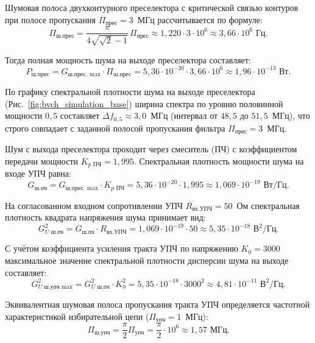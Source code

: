 Шумовая полоса двухконтурного преселектора с критической связью контуров при полосе пропускания $\Pi_{\text{прес}} = 3$~МГц рассчитывается по формуле:
\begin{equation}
    \Pi_{\text{ш.прес}} = \frac{\pi}{4\sqrt{\sqrt{2}-1}}\,\Pi_{\text{прес}} \approx 1{,}220 \cdot 3 \cdot 10^6 \approx 3{,}66 \cdot 10^6\text{ Гц}.
\end{equation}

Тогда полная мощность шума на выходе преселектора составляет:
\begin{equation}
    P_{\text{ш.прес}} = G_{\text{ш.прес. max}} \cdot \Pi_{\text{ш.прес}} = 5{,}36 \cdot 10^{-20} \cdot 3{,}66 \cdot 10^6 \approx 1{,}96 \cdot 10^{-13}\text{ Вт}.
\end{equation}

По графику спектральной плотности шума на выходе преселектора (Рис.~\ref{fig:bvch_simulation_base}) ширина спектра по уровню половинной мощности $0{,}5$ составляет $\Delta f_{0{,}5} \approx 3{,}0$~МГц (интервал от $48{,}5$ до $51{,}5$~МГц), что строго совпадает с заданной полосой пропускания фильтра $\Pi_{\text{прес}} = 3$~МГц.

Шум с выхода преселектора проходит через смеситель (ПЧ) с коэффициентом передачи мощности $K_{p\text{ ПЧ}} = 1{,}995$. Спектральная плотность мощности шума на входе УПЧ равна:
\begin{equation}
    G_{\text{ш.пч}} = G_{\text{ш.прес. max}} \cdot K_{p\text{ ПЧ}} = 5{,}36 \cdot 10^{-20} \cdot 1{,}995 \approx 1{,}069 \cdot 10^{-19}\text{ Вт/Гц}.
\end{equation}

На согласованном входном сопротивлении УПЧ $R_{\text{вх.УПЧ}} = 50$~Ом спектральная плотность квадрата напряжения шума принимает вид:
\begin{equation}
    G_{U\text{ ш.пч}}^2 = G_{\text{ш.пч}} \cdot R_{\text{вх.УПЧ}} = 1{,}069 \cdot 10^{-19} \cdot 50 \approx 5{,}35 \cdot 10^{-18}\text{ В}^2/\text{Гц}.
\end{equation}

С учётом коэффициента усиления тракта УПЧ по напряжению $K_0 = 3000$ максимальное значение спектральной плотности дисперсии шума на выходе составляет:
\begin{equation}
    G_{U\text{ ш.упч max}}^2 = G_{U\text{ ш.пч}}^2 \cdot K_0^2 = 5{,}35 \cdot 10^{-18} \cdot 3000^2 \approx 4{,}81 \cdot 10^{-11}\text{ В}^2/\text{Гц}.
\end{equation}

Эквивалентная шумовая полоса пропускания тракта УПЧ определяется частотной характеристикой избирательной цепи ($\Pi_{\text{упч}} = 1$~МГц):
\begin{equation}
    \Pi_{\text{ш.упч}} = \frac{\pi}{2} \Pi_{\text{упч}} = \frac{\pi}{2} \cdot 10^6 \approx 1{,}57\text{ МГц}.
\end{equation}

